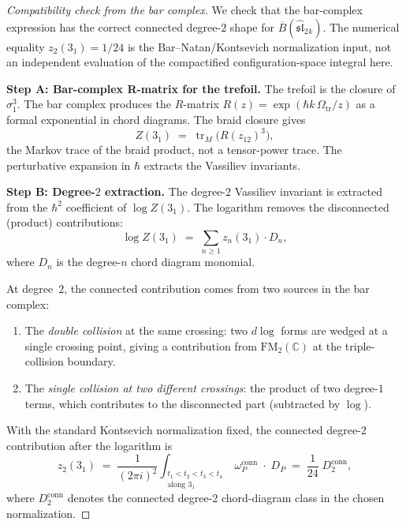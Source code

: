 \documentclass[11pt]{article}
\newcommand{\fsl}{\mathfrak{sl}}
\newcommand{\barB}{\overline{B}}
\newcommand{\C}{\mathbb{C}}
\newcommand{\FM}{\mathrm{FM}}
\begin{document}
\begin{proof}[Compatibility check from the bar complex]
We check that the bar-complex expression has the correct connected
degree-$2$ shape for $\barB(\widehat{\fsl}_2{}_k)$.  The numerical
equality $z_2(3_1)=1/24$ is the Bar--Natan/Kontsevich normalization
input, not an independent evaluation of the compactified
configuration-space integral here.

\medskip
\noindent\textbf{Step A: Bar-complex R-matrix for the trefoil.}
The trefoil is the closure of $\sigma_1^3$.  The bar complex
produces the $R$-matrix $R(z) = \exp(\hbar k\,\Omega_{\mathrm{tr}}/z)$
as a formal exponential in chord diagrams.  The braid closure
gives
\[
  Z(3_1)
  \;=\;
  \operatorname{tr}_{M}\bigl(R(z_{12})^3\bigr),
\]
the Markov trace of the braid product, not a tensor-power trace.
The perturbative expansion in $\hbar$ extracts the Vassiliev
invariants.

\medskip
\noindent\textbf{Step B: Degree-$2$ extraction.}
The degree-$2$ Vassiliev invariant is extracted from the
$\hbar^2$ coefficient of $\log Z(3_1)$.  The logarithm
removes the disconnected (product) contributions:
\[
  \log Z(3_1)
  \;=\;
  \sum_{n \ge 1} z_n(3_1) \cdot D_n,
\]
where $D_n$ is the degree-$n$ chord diagram monomial.

At degree~$2$, the connected contribution comes from two
sources in the bar complex:
\begin{enumerate}
\item The \emph{double collision} at the same crossing: two
  $d\log$ forms are wedged at a single crossing point, giving a
  contribution from $\FM_2(\C)$ at the triple-collision boundary.

\item The \emph{single collision at two different crossings}: the
  product of two degree-$1$ terms, which contributes to the
  disconnected part (subtracted by $\log$).
\end{enumerate}

With the standard Kontsevich normalization fixed, the connected
degree-$2$ contribution after the logarithm is
\begin{equation}\label{eq:connected-2}
  z_2(3_1)
  \;=\;
  \frac{1}{(2\pi i)^2}
  \int_{\substack{t_1 < t_2 < t_3 < t_4 \\
  \text{along } 3_1}}
  \omega_{P}^{\mathrm{conn}}\;\cdot\; D_P
  \;=\;
  \frac{1}{24}\;D_2^{\mathrm{conn}},
\end{equation}
where $D_2^{\mathrm{conn}}$ denotes the connected degree-$2$
chord-diagram class in the chosen normalization.


\end{proof}
\end{document}
